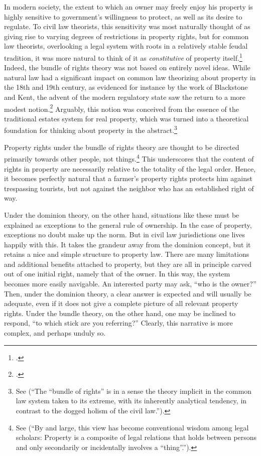 In modern society, the extent to which an owner may freely enjoy his property is highly sensitive to government's willingness to protect, as well as its desire to regulate. To civil law theorists, this sensitivity was most naturally thought of as giving rise to varying degrees of restrictions in property rights, but for common law theorists, overlooking a legal system with roots in a relatively stable feudal tradition, it was more natural to think of it as {\it constitutive} of property itself.\footcite[7]{chang12} Indeed, the bundle of rights theory was not based on entirely novel ideas. While natural law had a significant impact on common law theorizing about property in the 18th and 19th century, as evidenced for instance by the work of Blackstone and Kent, the advent of the modern regulatory state saw the return to a more modest notion.\footcite[195]{klein11} Arguably, this notion was conceived from the essence of the traditional estates system for real property, which was turned into a theoretical foundation for thinking about property in the abstract.\footnote{See \cite[7]{chang12}   
(``The ``bundle of rights'' is in a sense the theory implicit in the common law system taken to its extreme, with its inherently analytical tendency, in contrast to the dogged holism of the civil law.'').} 

Property rights under the bundle of rights theory are thought to be directed primarily towards other people, not things.\footnote{See \cite[357-358]{merrill01} (``By and large, this view has become conventional wisdom among legal scholars: Property is a composite of legal relations that holds between persons and only secondarily or incidentally involves a ``thing''.'').} This underscores that the content of rights in property are necessarily relative to the totality of the legal order. Hence, it becomes perfectly natural that a farmer's property rights protects him against trespassing tourists, but not against the neighbor who has an established right of way. 

Under the dominion theory, on the other hand, situations like these must be explained as exceptions to the general rule of ownership. In the case of property, exceptions no doubt make up the norm. But in civil law jurisdictions one lives happily with this. It takes the grandeur away from the dominion concept, but it retains a nice and simple structure to property law. There are many limitations and additional benefits attached to property, but they are all in principle carved out of one initial right, namely that of the owner. In this way, the system becomes more easily navigable. An interested party may ask, ``who is the owner?'' Then, under the dominion theory, a clear answer is expected and will usually be adequate, even if it does not give a complete picture of all relevant property rights. Under the bundle theory, on the other hand, one may be inclined to respond, ``to which stick are you referring?'' Clearly, this narrative is more complex, and perhaps unduly so. 

